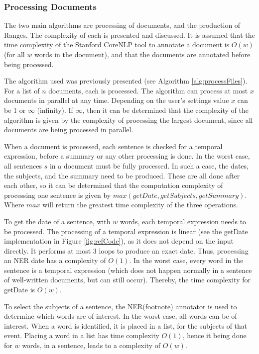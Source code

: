 \subsubsection{Processing Documents}
\par The two main algorithms are processing of documents, and the production of Ranges. The complexity of each is presented and discussed. It is assumed that the time complexity of the Stanford CoreNLP tool to annotate a document is $O(w)$ (for all $w$ words in the document), and that the documents are annotated before being processed.

\par The algorithm used was previously presented (see Algorithm \ref{alg:processFiles}). For a list of $n$ documents, each is processed. The algorithm can process at most $x$ documents in parallel at any time. Depending on the user's settings value $x$ can be 1 or $\infty$ (infinity). If $\infty$, then it can be determined that the complexity of the algorithm is given by the complexity of processing the largest document, since all documents are being processed in parallel. 

\par When a document is processed, each sentence is checked for a temporal expression, before a summary or any other processing is done. In the worst case, all sentences $s$ in a document must be fully processed. In such a case, the dates, the subjects, and the summary need to be produced. These are all done after each other, so it can be determined that the computation complexity of processing one sentence is given by $max(getDate, getSubjects, getSummary)$. Where $max$ will return the greatest time complexity of the three operations. 

\par To get the date of a sentence, with $w$ words, each temporal expression needs to be processed. The processing of a temporal expression is linear (see the getDate implementation in Figure \ref{fig:refCode}), as it does not depend on the input directly. It performs at most 3 loops to produce an exact date. Thus, processing an NER date has a complexity of $O(1)$. In the worst case, every word in the sentence is a temporal expression (which does not happen normally in a sentence of well-written documents, but can still occur). Thereby, the time complexity for getDate is $O(w)$.

\par To select the subjects of a sentence, the NER(footnote) annotator is used to determine which words are of interest. In the worst case, all words can be of interest. When a word is identified, it is placed in a list, for the subjects of that event. Placing a word in a list has time complexity $O(1)$, hence it being done for $w$ words, in a sentence, leads to a complexity of $O(w)$.

